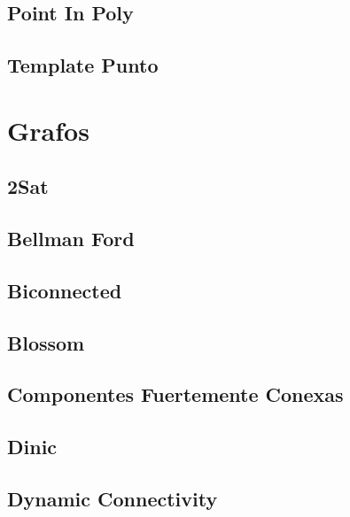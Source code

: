 \documentclass[10pt,portrait,twocolumn,a4paper,notitlepage]{article}
\newcommand\cppfile[2][]{%
\ifstrempty{#1}{}{}%
}
\begin{document}
\subsection{Point In Poly}
\cppfile{geometry_clean/point_in_poly.cpp}

\subsection{Template Punto}
\cppfile{geometry_clean/template_punto.cpp}


\section{Grafos}

\subsection{2Sat}
\cppfile{grafos_clean/2SAT.cpp}

\subsection{Bellman Ford}
\cppfile{grafos_clean/bellman_ford.cpp}

\subsection{Biconnected}
\cppfile{grafos_clean/biconnected.cpp}

\subsection{Blossom}
\cppfile{grafos_clean/blossom.cpp}

\subsection{Componentes Fuertemente Conexas}
\cppfile{grafos_clean/componentes_fuertemente_conexas.cpp}

\subsection{Dinic}
\cppfile{grafos_clean/dinic.cpp}

\subsection{Dynamic Connectivity}
\cppfile{grafos_clean/dynamic_Connectivity.cpp}
\end{document}
